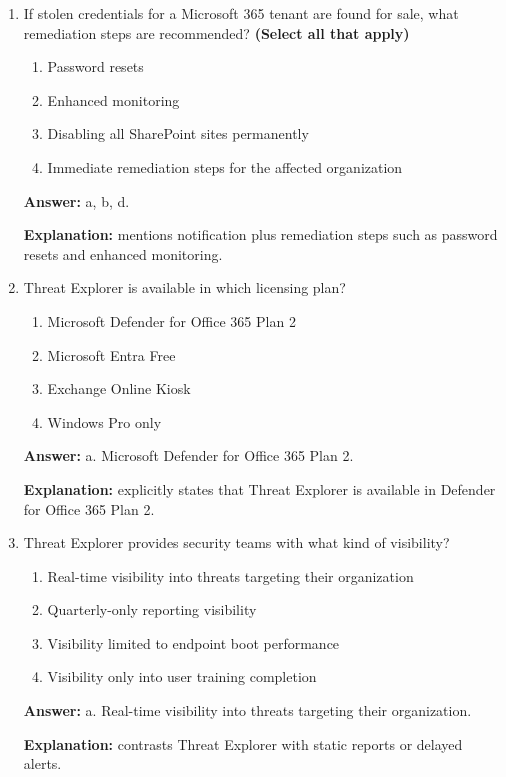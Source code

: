 \documentclass[10pt]{article}
\begin{document}
\begin{enumerate}[leftmargin=*]
\textbf{Explanation:} These are the three categories explicitly named in the dark web monitoring section.

\item If stolen credentials for a Microsoft 365 tenant are found for sale, what remediation steps are recommended? \textbf{(Select all that apply)}
\begin{enumerate}[label=\alph*., leftmargin=1.5em]
\item Password resets
\item Enhanced monitoring
\item Disabling all SharePoint sites permanently
\item Immediate remediation steps for the affected organization
\end{enumerate}
\textbf{Answer:} a, b, d.

\textbf{Explanation:} mentions notification plus remediation steps such as password resets and enhanced monitoring.

\item Threat Explorer is available in which licensing plan?
\begin{enumerate}[label=\alph*., leftmargin=1.5em]
\item Microsoft Defender for Office 365 Plan 2
\item Microsoft Entra Free
\item Exchange Online Kiosk
\item Windows Pro only
\end{enumerate}
\textbf{Answer:} a. Microsoft Defender for Office 365 Plan 2.

\textbf{Explanation:} explicitly states that Threat Explorer is available in Defender for Office 365 Plan 2.

\item Threat Explorer provides security teams with what kind of visibility?
\begin{enumerate}[label=\alph*., leftmargin=1.5em]
\item Real-time visibility into threats targeting their organization
\item Quarterly-only reporting visibility
\item Visibility limited to endpoint boot performance
\item Visibility only into user training completion
\end{enumerate}
\textbf{Answer:} a. Real-time visibility into threats targeting their organization.

\textbf{Explanation:} contrasts Threat Explorer with static reports or delayed alerts.


\end{enumerate}
\end{document}
